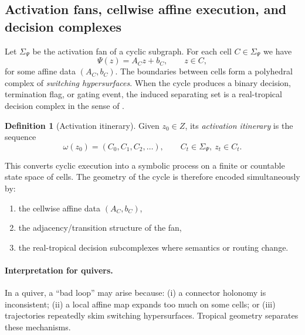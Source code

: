 \documentclass[11pt]{article}
\theoremstyle{definition}
\newtheorem{definition}{Definition}[section]
\theoremstyle{plain}
\theoremstyle{remark}
\begin{document}
\subsection{Activation fans, cellwise affine execution, and decision complexes}
Let $\Sigma_\Psi$ be the activation fan of a cyclic subgraph.
For each cell $C\in\Sigma_\Psi$ we have
\[
\Psi(z)=A_C z+b_C,\qquad z\in C,
\]
for some affine data $(A_C,b_C)$.
The boundaries between cells form a polyhedral complex of \emph{switching hypersurfaces}.
When the cycle produces a binary decision, termination flag, or gating event, the induced separating set is a real-tropical decision complex in the sense of \cite{BrandenburgLohoMontufar2024}.

\begin{definition}[Activation itinerary]
Given $z_0\in Z$, its \emph{activation itinerary} is the sequence
\[
\omega(z_0)=(C_0,C_1,C_2,\dots),\qquad C_t\in\Sigma_\Psi,\ z_t\in C_t.
\]
\end{definition}

This converts cyclic execution into a symbolic process on a finite or countable state space of cells.
The geometry of the cycle is therefore encoded simultaneously by:
\begin{enumerate}[leftmargin=2em]
\item the cellwise affine data $(A_C,b_C)$,
\item the adjacency/transition structure of the fan,
\item the real-tropical decision subcomplexes where semantics or routing change.
\end{enumerate}

\paragraph{Interpretation for quivers.}
In a quiver, a ``bad loop'' may arise because:
(i) a connector holonomy is inconsistent;
(ii) a local affine map expands too much on some cells; or
(iii) trajectories repeatedly skim switching hypersurfaces.
Tropical geometry separates these mechanisms.
\end{document}
